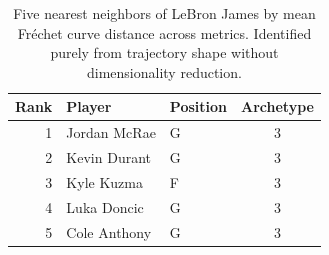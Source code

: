 \begin{table}[htbp]
  \centering\small
  \begin{tabular}{rllc}
    \toprule
    Rank & Player & Position & Archetype \\
    \midrule
    1 & Jordan McRae & G & 3 \\
    2 & Kevin Durant & G & 3 \\
    3 & Kyle Kuzma & F & 3 \\
    4 & Luka Doncic & G & 3 \\
    5 & Cole Anthony & G & 3 \\
    \bottomrule
  \end{tabular}
  \caption{Five nearest neighbors of LeBron James by mean Fr\'{e}chet curve distance across metrics. Identified purely from trajectory shape without dimensionality reduction.}
  \label{tab:LeBron_James_frechet_curve_neighbors}
\end{table}

